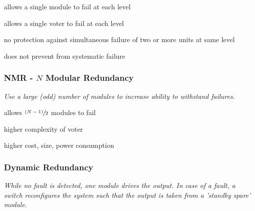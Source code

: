 \documentclass[
  10pt,
  a4paper,
]{article}
\begin{document}
\begin{multicols*}{2}
\resizebox{\columnwidth}{!}{
}

{\small\begin{description}[parsep=0mm,labelsep=2pt,labelwidth=10pt]
  \item[\color{OliveGreen}\faPlus] allows a single module to fail at each level
  \item[\color{OliveGreen}\faPlus] allows a single voter to fail at each level
  \item[\color{BrickRed}\faMinus] no protection against simultaneous failure of two or more units at same level
  \item[\color{BrickRed}\faMinus] does not prevent from systematic failure
\end{description}}

\subsubsection{\texorpdfstring{NMR - \(N\) Modular
Redundancy}{NMR - N Modular Redundancy}}\label{nmr---n-modular-redundancy}

{\small\textit{Use a large (odd) number of modules to increase ability to withstand failures.}}

\begin{center}

\end{center}

{\small\begin{description}[parsep=0mm,labelsep=2pt,labelwidth=10pt]
  \item[\color{OliveGreen}\faPlus] allows  $\sfrac{(N-1)}{2}$ modules to fail
  \item[\color{BrickRed}\faMinus] higher complexity of voter
  \item[\color{BrickRed}\faMinus] higher cost, size, power consumption
\end{description}}

\subsubsection{Dynamic Redundancy}\label{dynamic-redundancy}

{\small\textit{While no fault is detected, one module drives the output. In case of a fault, a switch reconfigures the system such that the output is taken from a ’standby spare’ module.}}

\begin{center}

\end{center}


\end{multicols*}
\end{document}
